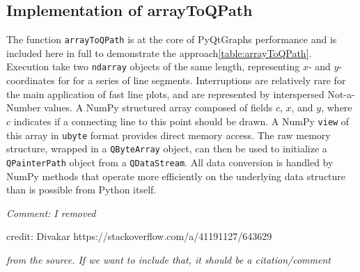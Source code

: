 \documentclass[journal]{vgtc}                %
\begin{document}
\subsection{Implementation of arrayToQPath}
\label{app_arrayToQPath}
The function \texttt{arrayToQPath} is at the core of PyQtGraphs performance and is included here in full to demonstrate the approach\ref{table:arrayToQPath}. 
Execution take two \texttt{ndarray} objects of the same length, representing $x$- and $y$-coordinates for for a series of line segments. Interruptions are relatively rare for the main application of fast line plots, and are represented by interspersed Not-a-Number values. A NumPy structured array composed of fields $c$, $x$, and $y$, where $c$ indicates if a connecting line to this point should be drawn. A NumPy \texttt{view} of this array in \texttt{ubyte} format provides direct memory access. The raw memory structure, wrapped in a \texttt{QByteArray} object, can then be used to initialize a \texttt{QPainterPath} object from a \texttt{QDataStream}. All data conversion is handled by NumPy methods that operate more efficiently on the underlying data structure than is possible from Python itself.

\emph{Comment: I removed}

credit: Divakar https://stackoverflow.com/a/41191127/643629

\emph{from the source. If we want to include that, it should be a citation/comment}
\end{document}
